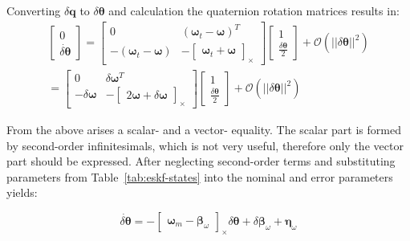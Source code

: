 Converting $\delta\mathbf{q}$ to $\delta\boldsymbol{\theta}$ and calculation the quaternion rotation matrices results in:
\begin{equation}
\begin{aligned}
    \begin{bmatrix}
        0 \\ \dot{\delta\boldsymbol{\theta}}
    \end{bmatrix} = 
    \begin{bmatrix}
        0 & {(\boldsymbol{\omega}_t-\boldsymbol{\omega})}^T \\
        -(\boldsymbol{\omega}_t-\boldsymbol{\omega}) & -\begin{bmatrix}\boldsymbol{\omega}_t+\boldsymbol{\omega}\end{bmatrix}_\times
    \end{bmatrix}
    \begin{bmatrix}
        1 \\ \frac{\delta\boldsymbol{\theta}}{2}
    \end{bmatrix} + \mathcal{O}(||\delta\boldsymbol{\theta}||^2) \\
    =\begin{bmatrix}
        0 & \delta\boldsymbol{\omega}^T \\
        -\delta\boldsymbol{\omega} & -\begin{bmatrix}2\boldsymbol{\omega}+\delta\boldsymbol{\omega}\end{bmatrix}_\times
    \end{bmatrix}
    \begin{bmatrix}
        1 \\ \frac{\delta\boldsymbol{\theta}}{2}
    \end{bmatrix} + \mathcal{O}(||\delta\boldsymbol{\theta}||^2)
\end{aligned}
\end{equation}

From the above arises a scalar- and a vector- equality. The scalar part is formed by second-order infinitesimals, which is not very useful, therefore only the vector part should be expressed. After neglecting second-order terms and substituting parameters from Table~\ref{tab:eskf-states} into the nominal and error parameters yields:

\begin{tcolorbox}
\begin{equation}
    \dot{\delta\boldsymbol{\theta}} = -\begin{bmatrix}
        \boldsymbol{\omega}_m-\boldsymbol{\beta}_\omega
    \end{bmatrix}_\times \delta\boldsymbol{\theta} + \delta\boldsymbol{\beta}_\omega + \boldsymbol{\eta}_\omega
\end{equation}
\end{tcolorbox}


